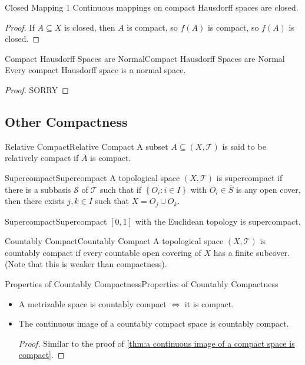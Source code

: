 \documentclass[../main.tex]{subfiles}
\begin{document}
\begin{proposition}{}{Closed Mapping 1}
Continuous mappings on compact Hausdorff spaces are closed.
\end{proposition}
\begin{proof}
If $A \subseteq X$ is closed, then $A$ is compact, so $f(A)$ is compact, so $f(A)$ is closed.
\end{proof}

\begin{theorem}{Compact Hausdorff Spaces are Normal}{Compact Hausdorff Spaces are Normal}
Every compact Hausdorff space is a normal space.
\end{theorem}
\begin{proof}
SORRY
\end{proof}

\subsection{Other Compactness}
\begin{definition}{Relative Compact}{Relative Compact}
A subset $A \subseteq (X,\mathcal{T})$ is said to be relatively compact if $\overline{A}$ is compact.
\end{definition}

\begin{definition}{Supercompact}{Supercompact}
A topological space $(X,\mathcal{T})$ is supercompact if there is a subbasis $\mathcal{S}$ of $\mathcal{T}$ such that if $\left\{ O_i:i\in I \right\}$ with $O_i \in \overline{S}$ is any open cover, then there exists $j,k\in I$ such that $X = O_j\cup O_k$.
\end{definition}

\begin{example}{Supercompact}{Supercompact}
	$[0,1]$ with the Euclidean topology is supercompact.
\end{example}

\begin{definition}{Countably Compact}{Countably Compact}
A topological space $(X,\mathcal{T})$ is countably compact if every countable open covering of $X$ has a finite subcover. (Note that this is weaker than compactness).
\end{definition}

\begin{proposition}{Properties of Countably Compactness}{Properties of Countably Compactness}
\begin{itemize}
\item A metrizable space is countably compact $\Leftrightarrow $ it is compact.
\item The continuous image of a countably compact space is countably compact.
	\begin{proof}
	Similar to the proof of \ref{thm:a continuous image of a compact space is compact}.
	\end{proof}
\end{itemize}
\end{proposition}
\end{document}
